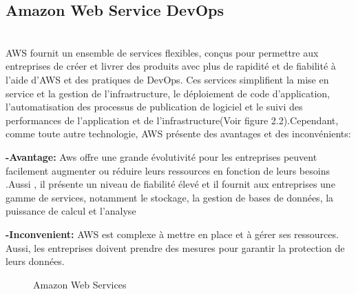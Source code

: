 \subsection{\LARGE Amazon Web Service DevOps}
\texttt{}\\[0.1cm]
\textsf{\selectfont{} AWS fournit un ensemble de services flexibles, conçus pour permettre aux entreprises de créer et livrer des produits avec plus de rapidité et de fiabilité à l'aide d'AWS et des pratiques de DevOps. Ces services simplifient la mise en service et la gestion de l'infrastructure, le déploiement de code d'application, l'automatisation des processus de publication de logiciel et le suivi des performances de l'application et de l'infrastructure(Voir figure 2.2).Cependant, comme toute autre technologie, AWS présente des avantages et des inconvénients: \cite{10}}\\[0.1cm]
\par \noindent \textbf{\Large -Avantage:}
\textsf{\selectfont{}Aws offre une grande évolutivité pour les entreprises peuvent facilement augmenter ou réduire leurs ressources en fonction de leurs besoins .Aussi , il présente un niveau de fiabilité élevé et il fournit aux entreprises une gamme de services, notamment le stockage, la gestion de bases de données, la puissance de calcul et l’analyse}\\[0.1cm]
\par \noindent \textbf{\Large -Inconvenient:}
\textsf{\selectfont{}AWS est complexe à mettre en place et à gérer ses ressources. Aussi, les entreprises doivent prendre des mesures pour garantir la protection de leurs données.}
\begin{figure}[H]
  \begin{center}
  

  \end{center}
  
  \caption{Amazon Web Services}
\end{figure}
